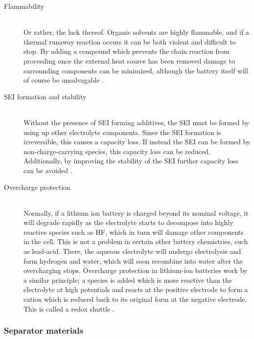 \documentclass[12pt]{article} %
\begin{document}
\begin{description} %

\item[Flammability] \hfill \\
Or rather, the lack thereof.
Organic solvents are highly flammable, and if a thermal runaway reaction occurs it can be both violent and difficult to stop.
By adding a compound which prevents the chain reaction from proceeding once the external heat source has been removed damage to surrounding components can be minimized, although the battery itself will of course be unsalvagable \cite{blomgren_liquid_2003}.

\item[SEI formation and stability] \hfill \\
Without the presence of SEI forming additives, the SEI must be formed by using up other electrolyte components.
Since the SEI formation is irreversible, this causes a capacity loss.
If instead the SEI can be formed by non-charge-carrying species, this capacity loss can be reduced.
Additionally, by improving the stability of the SEI further capacity loss can be avoided \cite{reddy_thomas_section_2011-4}.

\item[Overcharge protection] \hfill \\
Normally, if a lithium ion battery is charged beyond its nominal voltage, it will degrade rapidly as the electrolyte starts to decompose into highly reactive species such as HF, which in turn will damage other components in the cell.
This is not a problem in certain other battery chemistries, such as lead-acid.
There, the aqueous electrolyte will undergo electrolysis and form hydrogen and water, which will soon recombine into water after the overcharging stops.
Overcharge protection in lithium-ion batteries work by a similar principle; a species is added which is more reactive than the electrolyte at high potentials and reacts at the positive electrode to form a cation which is reduced back to its original form at the negative electrode.
This is called a redox shuttle \cite{blomgren_liquid_2003} \cite{reddy_thomas_section_2011-4}.

\end{description} 

\subsubsection{Separator materials} %
\end{document}
